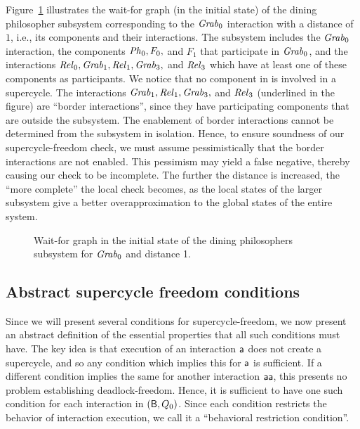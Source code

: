 Figure~\ref{fig:sc-local-dining} illustrates the wait-for graph (in the initial state) of the dining philosopher subsystem corresponding to the
$\mathit{Grab}_0$ interaction with a distance of $1$, i.e., its components and their interactions.  The subsystem includes the $\mathit{Grab}_0$ interaction,
the components $\mathit{Ph}_0, F_0,$ and $F_1$ that participate in $\mathit{Grab}_0$, and the interactions $\mathit{Rel}_0, \mathit{Grab}_1,\mathit{Rel}_1, \mathit{Grab}_3,$ and $\mathit{Rel}_3$ which have
at least one of these components as participants.  We notice that no component in  is involved in a supercycle.
%
The interactions  $\mathit{Grab}_1,\mathit{Rel}_1, \mathit{Grab}_3,$ and $\mathit{Rel}_3$ (underlined in the figure) are ``border interactions'', since they have participating components that are outside the subsystem.
The enablement of border interactions cannot be determined from the subsystem in isolation. Hence, to ensure soundness of our supercycle-freedom check,
we must assume pessimistically  that the border interactions are not enabled. This pessimism may yield a false negative, thereby causing our check to
be incomplete. The further the distance is increased, the ``more complete'' the local check becomes, as the local states of the larger subsystem give a
better overapproximation to the global states of the entire system.

\begin{figure*}[ht]
  \begin{center}
   \scalebox{0.4}{}
   \caption{Wait-for graph in the initial state of the dining philosophers subsystem for $\mathit{Grab}_0$ and distance 1.}
   \label{fig:sc-local-dining}
  \end{center}
\end{figure*}









\subsection{Abstract supercycle freedom conditions}
\label{secn:abstract-scfree-conditions}

Since we will present several conditions for supercycle-freedom, we now present an abstract
definition of the essential properties that all such conditions must have.  The key idea is that
execution of an interaction $\mathsf{a}$ does not create a supercycle, and so any condition which implies 
this for $\mathsf{a}$ is sufficient. If a different condition implies the same for another interaction
$\mathsf{aa}$, this presents no problem \wrt establishing deadlock-freedom. Hence, it is sufficient to
have one such condition for each interaction in  $(\mathsf{B},Q_0)$. Since each condition restricts the
behavior of interaction execution, we call it a ``behavioral restriction condition''.

